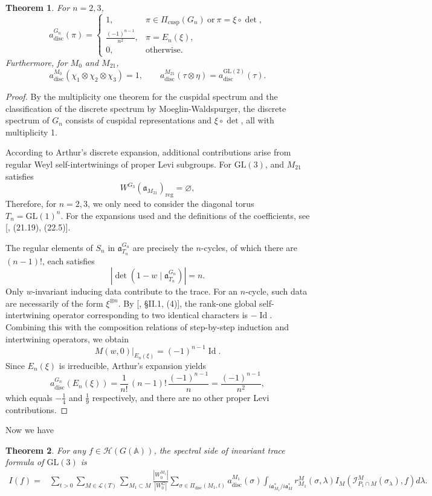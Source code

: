 \documentclass[11pt]{amsart}
\newtheorem {theorem}    {Theorem}[section]
\renewcommand{\rm}{\mathrm}
\newcommand{\GGL}{\mathrm{GL}}
\theoremstyle{definition}
\numberwithin{equation}{section}
\begin{document}
	\begin{theorem}\label{a_s}
		For \(n = 2, 3\),
		\[
		a_{\mathrm{disc}}^{G_n}(\pi) = 
		\begin{cases} 
			1, & \pi\in\Pi_{\rm{cusp}}(G_n)\  \text{or}\  \pi = \xi \circ \det, \\
			\frac{(-1)^{n-1}}{n^2}, & \pi = E_n(\xi),\\
			0, & \text{otherwise}.
		\end{cases}
		\]
		Furthermore, for \(M_0\) and \(M_{21}\),
		\[
		a_{\mathrm{disc}}^{M_0}(\chi_1 \otimes \chi_2 \otimes \chi_3) = 1, \qquad a_{\mathrm{disc}}^{M_{21}}(\tau \otimes \eta) = a_{\mathrm{disc}}^{\GGL(2)}(\tau).
		\]
	\end{theorem}
	\begin{proof}
		By the multiplicity one theorem for the cuspidal spectrum and the classification of the discrete spectrum by Moeglin-Waldspurger, the discrete spectrum of \(G_n\) consists of cuspidal representations and \(\xi \circ \det\), all with multiplicity 1.
		
		According to Arthur's discrete expansion, additional contributions arise from regular Weyl self-intertwinings of proper Levi subgroups. For \(\mathrm{GL}(3)\), and \(M_{21}\) satisfies
		\[
		W^{G_3}(\mathfrak{a}_{M_{21}})_{\mathrm{reg}} = \varnothing,
		\]
		Therefore, for \(n = 2, 3\), we only need to consider the diagonal torus \(T_n=\GGL(1)^n\). For the expansions used and the definitions of the coefficients, see [\cite{Art05}, (21.19), (22.5)].
		
		The regular elements of \(S_n\) in \(\mathfrak{a}_{T_n}^{G_n}\) are precisely the \(n\)-cycles, of which there are \((n - 1)!\), each satisfies
		\[
		\left| \det(1 - w \mid \mathfrak{a}_{T_n}^{G_n}) \right| = n.
		\]
		Only \(w\)-invariant inducing data contribute to the trace. For an $n$-cycle, such data are necessarily of the form \(\xi^{\otimes n}\). By [\cite{MW89}, \S II.1, (4)], the rank-one global self-intertwining operator corresponding to two identical characters is \(-\operatorname{Id}\). Combining this with the composition relations of step-by-step induction and intertwining operators, we obtain
		\[
		M(w,0)\big|_{E_n(\xi)} = (-1)^{n-1}\operatorname{Id}.
		\]
		Since $E_n(\xi)$ is irreducible, Arthur's expansion yields
		\[
		a_{\mathrm{disc}}^{G_n}(E_n(\xi)) = \frac{1}{n!} \, (n-1)! \, \frac{(-1)^{n-1}}{n} = \frac{(-1)^{n-1}}{n^2},
		\]
		which equals \(-\frac{1}{4}\) and \(\frac{1}{9}\) respectively, and there are no other proper Levi contributions. 
	\end{proof}
    Now we have 
    \begin{theorem}\label{main3}
        For any \(f\in \mathcal{H}(G(\mathbb{A}))\), the spectral side of invariant trace formula of \(\GGL(3)\) is 
        \begin{align*}
		I(f) = & \sum_{t>0}\sum_{M \in \mathcal{L}(T)} \sum_{M_1 \subset M}\frac{|W_0^{M_1}|}{|W_0^G|} \sum_{\sigma \in \Pi_{\mathrm{disc}}(M_1, t)} a_{\mathrm{disc}}^{M_1}(\sigma)\int_{i\mathfrak{a}_{M_1}^* / i\mathfrak{a}_M^*} r_{M_1}^M(\sigma, \lambda) I_M \left( \mathscr{I}_{P_1\cap M}^M(\sigma_\lambda), f \right) d\lambda.
	\end{align*}
    \end{theorem}
\end{document}
